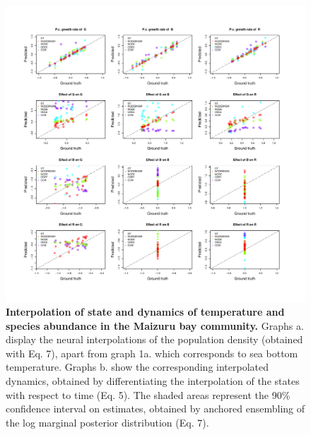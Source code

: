 \documentclass[11pt, oneside]{article}
\begin{document}
\begin{figure}[H]
\includegraphics[width=1\linewidth,page=19]{figures/figures_supplementary.pdf}
\caption{
    \textbf{Interpolation of state and dynamics of temperature and species abundance in the Maizuru bay community.}
    Graphs a. display the neural interpolations of the population density (obtained with Eq. 7), apart from graph 1a. which corresponds to sea bottom temperature. 
    Graphs b. show the corresponding interpolated dynamics, obtained by differentiating the interpolation of the states with respect to time (Eq. 5). 
    The shaded areas represent the 90\% confidence interval on estimates, obtained by anchored ensembling of the log marginal posterior distribution (Eq. 7).
}
\end{figure}
\newpage
\end{document}
